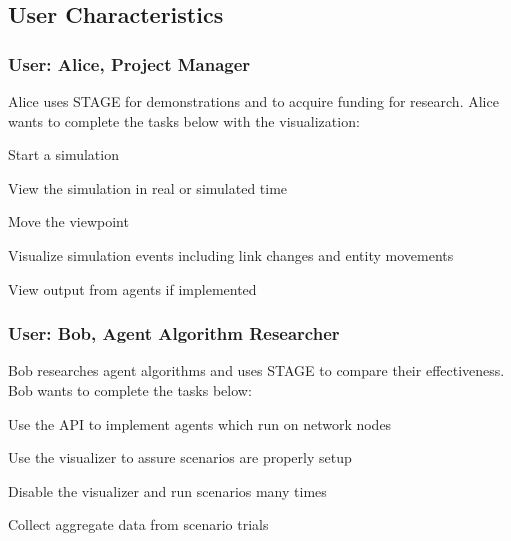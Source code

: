 \documentclass[titlepage]{article}
\begin{document}

\subsection{User Characteristics%
  \label{user-characteristics}%
}



\subsubsection{User: Alice, Project Manager%
  \label{alice}%
}

Alice uses STAGE for demonstrations and to acquire funding for research.  Alice wants to complete the tasks below with
the visualization:

\begin{itemize*}
    \item Start a simulation
    \item View the simulation in real or simulated time
    \item Move the viewpoint
    \item Visualize simulation events including link changes and entity movements
    \item View output from agents if implemented
\end{itemize*}

\subsubsection{User: Bob, Agent Algorithm Researcher%
  \label{bob}%
}

Bob researches agent algorithms and uses STAGE to compare their effectiveness.  Bob wants to complete the tasks below:

\begin{itemize*}
    \item Use the API to implement agents which run on network nodes
    \item Use the visualizer to assure scenarios are properly setup
    \item Disable the visualizer and run scenarios many times
    \item Collect aggregate data from scenario trials
\end{itemize*}
\end{document}
